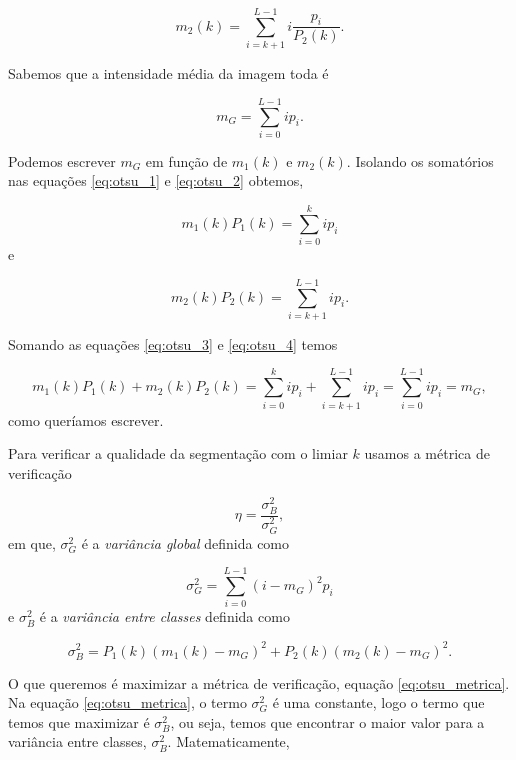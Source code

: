 \begin{equation}
	m_2(k) = \sum_{i=k+1}^{L-1} i \frac{p_i}{P_2(k)}.
	\label{eq:otsu_2}
\end{equation}

Sabemos que a intensidade média da imagem toda é 

\begin{equation}
	m_G = \sum_{i=0}^{L-1} ip_i.
\end{equation}

Podemos escrever $m_G$ em função de $m_1(k)$ e $m_2(k)$. Isolando os somatórios nas equações \ref{eq:otsu_1} e \ref{eq:otsu_2} obtemos,

\begin{equation}
	m_1(k)P_1(k) = \sum_{i=0}^{k} i p_i
	\label{eq:otsu_3}
\end{equation}
e

\begin{equation}
	m_2(k)P_2(k) = \sum_{i=k+1}^{L-1} i p_i.
	\label{eq:otsu_4}
\end{equation}

Somando as equações \ref{eq:otsu_3} e \ref{eq:otsu_4} temos 

\begin{equation}
	m_1(k)P_1(k) + m_2(k)P_2(k) = \sum_{i=0}^{k}ip_i + \sum_{i=k+1}^{L-1}ip_i = \sum_{i=0}^{L-1}ip_i = m_G,
\end{equation}
como queríamos escrever.

Para verificar a qualidade da segmentação com o limiar $k$ usamos a métrica de verificação 

\begin{equation}
	\eta = \frac{\sigma_B^2}{\sigma_G^2},
	\label{eq:otsu_metrica}
\end{equation}
em que, $\sigma_G^2$ é a \textit{variância global} definida como 

\begin{equation}
	\sigma_G^2 = \sum_{i=0}^{L-1} (i - m_G)^2 p_i
\end{equation}
e $\sigma_B^2$ é a \textit{variância entre classes} definida como 

\begin{equation}
	\sigma_B^2 = P_1(k)(m_1(k) - m_G)^2 + P_2(k)(m_2(k) - m_G)^2.
\end{equation}

O que queremos é maximizar a métrica de verificação, equação \ref{eq:otsu_metrica}. Na equação \ref{eq:otsu_metrica}, o termo $\sigma_G^2$ é uma constante, logo o termo que temos que maximizar é $\sigma_B^2$, ou seja, temos que encontrar o maior valor para a variância entre classes, $\sigma_B^2$. Matematicamente,


